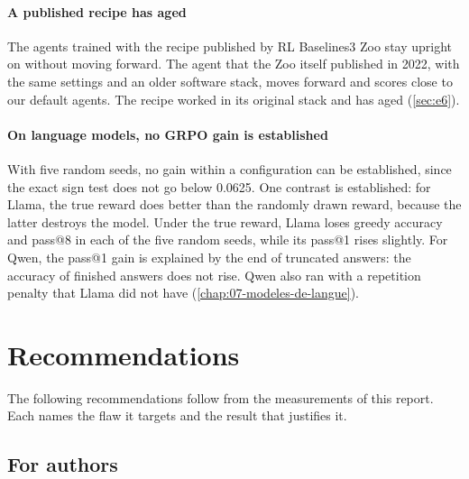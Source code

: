 \paragraph{A published recipe has aged} The agents trained with the recipe published by RL
Baselines3 Zoo stay upright on  without moving forward. The agent that the Zoo itself
published in 2022, with the same settings and an older software stack, moves forward and scores
close to our default agents. The recipe worked in its original stack and has aged (\cref{sec:e6}).

\paragraph{On language models, no GRPO gain is established} With five random seeds, no gain within a configuration can be
established, since the exact sign test does not go below 0.0625. One contrast is established: for
Llama, the true reward does better than the randomly drawn reward, because the latter destroys the
model. Under the true reward, Llama loses greedy accuracy and pass@8 in each of the five random seeds,
while its pass@1 rises slightly. For Qwen, the pass@1 gain is explained by the end of truncated
answers: the accuracy of finished answers does not rise. Qwen also ran with a repetition penalty that
Llama did not have (\cref{chap:07-modeles-de-langue}). 

\section{Recommendations}
\label{sec:recommandations}

The following recommendations follow from the measurements of this report. Each names the flaw it
targets and the result that justifies it.

\subsection{For authors}

